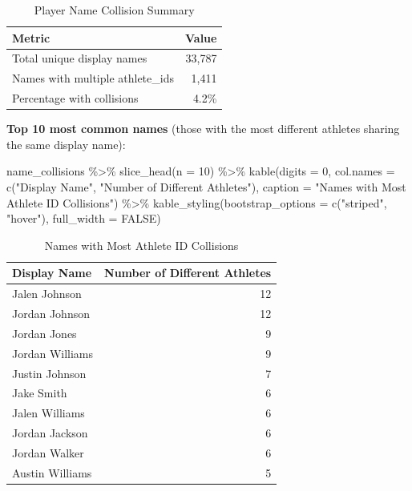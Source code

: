 \documentclass[
  letterpaper,
  DIV=11,
  numbers=noendperiod]{scrartcl}
\newenvironment{Shaded}{\begin{snugshade}}{\end{snugshade}}
\newcommand{\AttributeTok}[1]{\textcolor[rgb]{0.40,0.45,0.13}{#1}}
\newcommand{\ConstantTok}[1]{\textcolor[rgb]{0.56,0.35,0.01}{#1}}
\newcommand{\DecValTok}[1]{\textcolor[rgb]{0.68,0.00,0.00}{#1}}
\newcommand{\FunctionTok}[1]{\textcolor[rgb]{0.28,0.35,0.67}{#1}}
\newcommand{\NormalTok}[1]{\textcolor[rgb]{0.00,0.23,0.31}{#1}}
\newcommand{\SpecialCharTok}[1]{\textcolor[rgb]{0.37,0.37,0.37}{#1}}
\newcommand{\StringTok}[1]{\textcolor[rgb]{0.13,0.47,0.30}{#1}}
\begin{document}
\begin{longtable}[t]{lr}
\caption{\label{tab:verify-player-ids}Player Name Collision Summary}\\
\toprule
Metric & Value\\
\midrule
Total unique display names & 33,787\\
Names with multiple athlete\_ids & 1,411\\
Percentage with collisions & 4.2\%\\
\bottomrule
\end{longtable}

\textbf{Top 10 most common names} (those with the most different
athletes sharing the same display name):

\begin{Shaded}
\begin{Highlighting}[]
\NormalTok{name\_collisions }\SpecialCharTok{\%\textgreater{}\%}
  \FunctionTok{slice\_head}\NormalTok{(}\AttributeTok{n =} \DecValTok{10}\NormalTok{) }\SpecialCharTok{\%\textgreater{}\%}
  \FunctionTok{kable}\NormalTok{(}\AttributeTok{digits =} \DecValTok{0}\NormalTok{,}
        \AttributeTok{col.names =} \FunctionTok{c}\NormalTok{(}\StringTok{"Display Name"}\NormalTok{, }\StringTok{"Number of Different Athletes"}\NormalTok{),}
        \AttributeTok{caption =} \StringTok{"Names with Most Athlete ID Collisions"}\NormalTok{) }\SpecialCharTok{\%\textgreater{}\%}
  \FunctionTok{kable\_styling}\NormalTok{(}\AttributeTok{bootstrap\_options =} \FunctionTok{c}\NormalTok{(}\StringTok{"striped"}\NormalTok{, }\StringTok{"hover"}\NormalTok{), }\AttributeTok{full\_width =} \ConstantTok{FALSE}\NormalTok{)}
\end{Highlighting}
\end{Shaded}

\begin{longtable}[t]{lr}
\caption{\label{tab:top-collisions}Names with Most Athlete ID Collisions}\\
\toprule
Display Name & Number of Different Athletes\\
\midrule
Jalen Johnson & 12\\
Jordan Johnson & 12\\
Jordan Jones & 9\\
Jordan Williams & 9\\
Justin Johnson & 7\\
\addlinespace
Jake Smith & 6\\
Jalen Williams & 6\\
Jordan Jackson & 6\\
Jordan Walker & 6\\
Austin Williams & 5\\
\bottomrule
\end{longtable}
\end{document}
